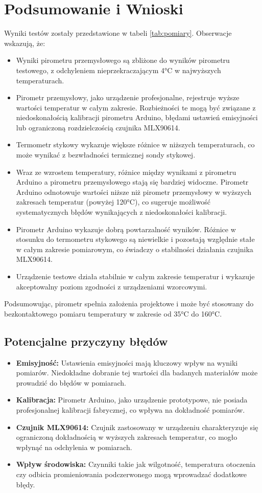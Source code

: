 \chapter{Podsumowanie i Wnioski}

Wyniki testów zostały przedstawione w tabeli \ref{tab:pomiary}. Obserwacje wskazują, że:
\begin{itemize}
\item Wyniki pirometru przemysłowego są zbliżone do wyników pirometru testowego, z odchyleniem nieprzekraczającym 4°C w najwyższych temperaturach.
\item Pirometr przemysłowy, jako urządzenie profesjonalne, rejestruje wyższe wartości temperatur w całym zakresie. Rozbieżności te mogą być związane z niedoskonałością kalibracji pirometru Arduino, błędami ustawień emisyjności lub ograniczoną rozdzielczością czujnika MLX90614.
\item Termometr stykowy wykazuje większe różnice w niższych temperaturach, co może wynikać z bezwładności termicznej sondy stykowej.
\item Wraz ze wzrostem temperatury, różnice między wynikami z pirometru Arduino a pirometru przemysłowego stają się bardziej widoczne. Pirometr Arduino odnotowuje wartości niższe niż pirometr przemysłowy w wyższych zakresach temperatur (powyżej 120°C), co sugeruje możliwość systematycznych błędów wynikających z niedoskonałości kalibracji.
\item Pirometr Arduino wykazuje dobrą powtarzalność wyników. Różnice w stosunku do termometru stykowego są niewielkie i pozostają względnie stałe w całym zakresie pomiarowym, co świadczy o stabilności działania czujnika MLX90614.
\item Urządzenie testowe działa stabilnie w całym zakresie temperatur i wykazuje akceptowalny poziom zgodności z urządzeniami wzorcowymi.
\end{itemize}

Podsumowując, pirometr spełnia założenia projektowe i może być stosowany do bezkontaktowego pomiaru temperatury w zakresie od 35°C do 160°C.

\section{Potencjalne przyczyny błędów}
\begin{itemize}
    \item \textbf{Emisyjność:} Ustawienia emisyjności mają kluczowy wpływ na wyniki pomiarów. Niedokładne dobranie tej wartości dla badanych materiałów może prowadzić do błędów w pomiarach.
    \item \textbf{Kalibracja:} Pirometr Arduino, jako urządzenie prototypowe, nie posiada profesjonalnej kalibracji fabrycznej, co wpływa na dokładność pomiarów.
    \item \textbf{Czujnik MLX90614:} Czujnik zastosowany w urządzeniu charakteryzuje się ograniczoną dokładnością w wyższych zakresach temperatur, co mogło wpłynąć na odchylenia w pomiarach.
    \item \textbf{Wpływ środowiska:} Czynniki takie jak wilgotność, temperatura otoczenia czy odbicia promieniowania podczerwonego mogą wprowadzać dodatkowe błędy.
\end{itemize}


